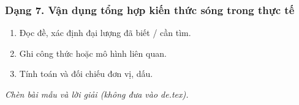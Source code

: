\subsubsection{Dạng 7. Vận dụng tổng hợp kiến thức sóng trong thực tế}
\begin{phuongphap}
\begin{enumerate}
\item Đọc đề, xác định đại lượng đã biết / cần tìm.
\item Ghi công thức hoặc mô hình liên quan.
\item Tính toán và đối chiếu đơn vị, dấu.
\end{enumerate}
\end{phuongphap}
\begin{vidumau}
\textit{Chèn bài mẫu và lời giải (không đưa vào de.tex).}
\end{vidumau}

